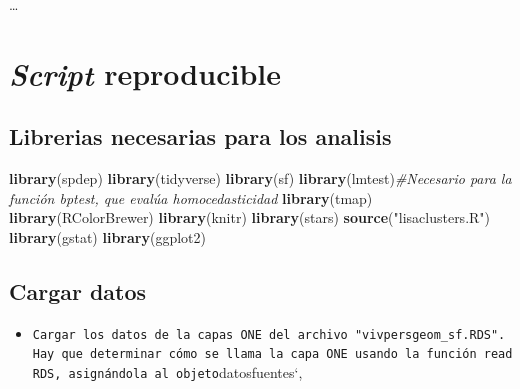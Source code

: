 \documentclass[11pt,]{article}
\newenvironment{Shaded}{\begin{snugshade}}{\end{snugshade}}
\newcommand{\KeywordTok}[1]{\textcolor[rgb]{0.13,0.29,0.53}{\textbf{#1}}}
\newcommand{\DataTypeTok}[1]{\textcolor[rgb]{0.13,0.29,0.53}{#1}}
\newcommand{\DecValTok}[1]{\textcolor[rgb]{0.00,0.00,0.81}{#1}}
\newcommand{\StringTok}[1]{\textcolor[rgb]{0.31,0.60,0.02}{#1}}
\newcommand{\CommentTok}[1]{\textcolor[rgb]{0.56,0.35,0.01}{\textit{#1}}}
\newcommand{\OtherTok}[1]{\textcolor[rgb]{0.56,0.35,0.01}{#1}}
\newcommand{\OperatorTok}[1]{\textcolor[rgb]{0.81,0.36,0.00}{\textbf{#1}}}
\newcommand{\NormalTok}[1]{#1}
\providecommand{\tightlist}{%
\setlength{\itemsep}{0pt}\setlength{\parskip}{0pt}}
\begin{document}
\ldots

\section{\texorpdfstring{\emph{Script}
reproducible}{Script reproducible}}\label{script-reproducible}

\subsection{Librerias necesarias para los
analisis}\label{librerias-necesarias-para-los-analisis}

\begin{Shaded}
\begin{Highlighting}[]
\KeywordTok{library}\NormalTok{(spdep)}
\KeywordTok{library}\NormalTok{(tidyverse)}
\KeywordTok{library}\NormalTok{(sf)}
\KeywordTok{library}\NormalTok{(lmtest)}\CommentTok{#Necesario para la función bptest, que evalúa homocedasticidad}
\KeywordTok{library}\NormalTok{(tmap)}
\KeywordTok{library}\NormalTok{(RColorBrewer)}
\KeywordTok{library}\NormalTok{(knitr)}
\KeywordTok{library}\NormalTok{(stars)}
\KeywordTok{source}\NormalTok{(}\StringTok{"lisaclusters.R"}\NormalTok{)}
\KeywordTok{library}\NormalTok{(gstat)}
\KeywordTok{library}\NormalTok{(ggplot2)}
\end{Highlighting}
\end{Shaded}

\subsection{Cargar datos}\label{cargar-datos}

\begin{itemize}
\tightlist
\item
  \texttt{Cargar\ los\ datos\ de\ la\ capas\ ONE\ del\ archivo\ "vivpersgeom\_sf.RDS".\ Hay\ que\ determinar\ cómo\ se\ llama\ la\ capa\ ONE\ usando\ la\ función\ readRDS,\ asignándola\ al\ objeto}datosfuentes`,
\end{itemize}

\begin{Shaded}
\end{Shaded}
\end{document}
